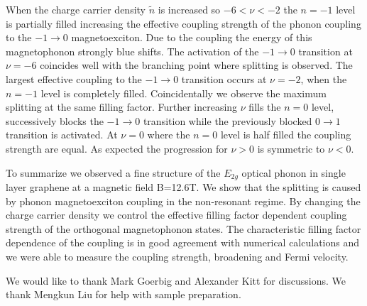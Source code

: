 \documentclass[prl,aps,superscriptaddress,reprint]{revtex4-1}
\begin{document}
When the charge carrier density $\widetilde{n}$ is increased so $-6<\nu<-2$ the $n=-1$ level is partially filled increasing the effective coupling strength of the phonon coupling to the $-1\rightarrow 0$ magnetoexciton. Due to the coupling the energy of this magnetophonon strongly blue shifts. The activation of the $-1\rightarrow 0$ transition at $\nu = -6$ coincides well with the branching point where splitting is observed.
The largest effective coupling to the $-1\rightarrow 0$ transition  occurs at $\nu =-2$, when the $n=-1$ level is completely filled. Coincidentally we observe the maximum splitting at the same filling factor. Further increasing $\nu$ fills the $n=0$ level, successively blocks the $-1\rightarrow 0$ transition while the previously blocked $0\rightarrow 1$ transition is activated. At $\nu=0$ where the $n=0$ level is half filled the coupling strength are equal. As expected the progression for $\nu>0$ is symmetric to $\nu<0$.

To summarize we observed a fine structure of the $E_{2g}$ optical phonon in single layer graphene at a magnetic field B=12.6T. We show that the splitting is caused by phonon magnetoexciton coupling in the non-resonant regime. By changing the charge carrier density we control the effective filling factor dependent coupling strength of the orthogonal magnetophonon states. The characteristic filling factor dependence of the coupling is in good agreement with numerical calculations and we were able to measure the coupling strength, broadening and Fermi velocity. 
\\

\begin{acknowledgments}
We would like to thank Mark Goerbig and Alexander Kitt for discussions. We thank Mengkun Liu for help with sample preparation.
\end{acknowledgments}

%
%
\end{document}
